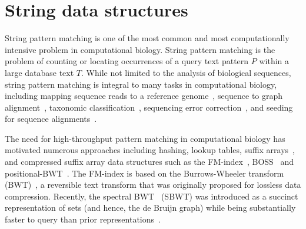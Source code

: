 \section{String data structures}

%
String pattern matching is one of the most common and most computationally intensive problem in computational biology.
%
String pattern matching is the problem of counting or locating occurrences of a query text pattern $P$ within a large database text $T$. While not limited to the analysis of biological sequences, string pattern matching is integral to many tasks in computational biology, including mapping sequence reads to a reference genome~\cite{li2009fast,langmead2009ultrafast}, sequence to graph alignment~\cite{Jain2020}, taxonomic classification~\cite{menzel2016fast,kim2016centrifuge}, sequencing error correction~\cite{huang2017efficient}, and seeding for sequence alignments~\cite{buchfink2015fast,altschul1990basic,steinegger2017mmseqs2}.

The need for high-throughput pattern matching in computational biology has motivated numerous approaches including hashing, lookup tables, suffix arrays~\cite{manber1993suffix}, and compressed suffix array data structures such as the FM-index~\cite{ferragina2000opportunistic}, BOSS~\cite{Muggli2019} and positional-BWT~\cite{Durbin2014}.
The FM-index is based on the Burrows-Wheeler transform (BWT)~\cite{burrows1994block}, a reversible text transform that was originally proposed for lossless data compression.   Recently, the spectral BWT~\cite{alanko2023small} (SBWT) was introduced as a succinct representation of \kmer sets (and hence, the de Bruijn graph) while being substantially faster to query than prior representations~\cite{Muggli2019}.


